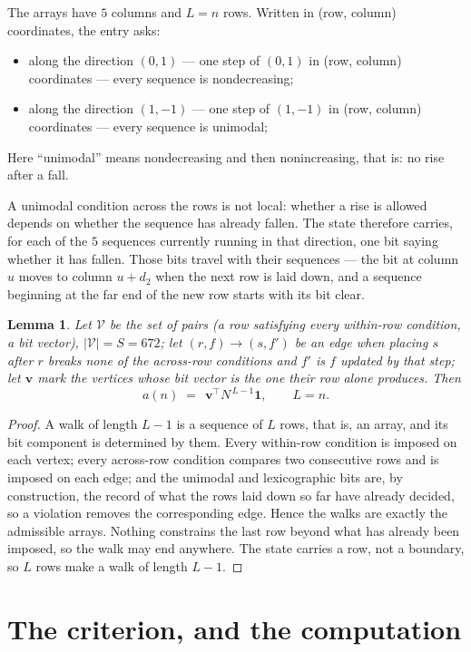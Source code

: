 \documentclass[11pt,a4paper]{article}
\theoremstyle{plain}
\newtheorem{lemma}[theorem]{Lemma}
\theoremstyle{definition}
\begin{document}
The arrays have $5$ columns and $L=n$ rows. Written in (row, column)
coordinates, the entry asks:
\begin{itemize}
\item along the direction $(0,1)$ --- one step of $(0,1)$ in (row, column) coordinates --- every sequence is nondecreasing;
\item along the direction $(1,-1)$ --- one step of $(1,-1)$ in (row, column) coordinates --- every sequence is unimodal;
\end{itemize}
Here ``unimodal'' means nondecreasing and then nonincreasing, that is: no rise after a fall.

A unimodal condition across the rows is not local: whether a
rise is allowed depends on whether the sequence has already fallen. The state therefore
carries, for each of the $5$ sequences currently running in that direction, one bit saying
whether it has fallen. Those bits travel with their sequences --- the bit at column $u$
moves to column $u+d_2$ when the next row is laid down, and a sequence beginning at the
far end of the new row starts with its bit clear.

\begin{lemma}\label{lem:walk}
Let $\mathcal V$ be the set of pairs (a row satisfying every within-row condition, a
bit vector), $|\mathcal V|=S=672$; let $(r,f)\to(s,f')$ be an edge when placing $s$ after $r$
breaks none of the across-row conditions and $f'$ is $f$ updated by that step; let
$\mathbf{v}$ mark the vertices whose bit vector is the one their row alone produces.
Then
\[
a(n)\;=\;\,\mathbf{v}^{\!\top}N^{\,L-1}\mathbf{1},\qquad L=n.
\]
\end{lemma}

\begin{proof}
A walk of length $L-1$ is a sequence of $L$ rows, that is, an array, and its bit component
is determined by them. Every within-row condition is imposed on each vertex; every
across-row condition compares two consecutive rows and is imposed on each edge; and the
unimodal and lexicographic bits are, by construction, the record of what the rows laid down
so far have already decided, so a violation removes the corresponding edge. Hence the walks
are exactly the admissible arrays. Nothing constrains the last row beyond what has already
been imposed, so the walk may end anywhere. The state carries a row, not a boundary, so
$L$ rows make a walk of length $L-1$.
\end{proof}

\section{The criterion, and the computation}
\end{document}
